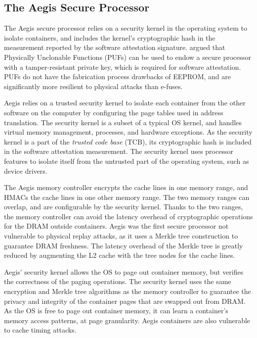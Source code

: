 \subsection{The Aegis Secure Processor}

The Aegis secure processor \cite{suh2003aegis} relies on a security kernel in the operating system to isolate containers, and includes the kernel's cryptographic hash in the measurement reported by the software attestation signature.  \cite{aegis_impl} argued that
Physically Unclonable Functions (PUFs) \cite{gassend2002puf} can be used to
endow a secure processor with a tamper-resistant private key, which is required
for software attestation. PUFs do not have the fabrication process drawbacks of
EEPROM, and are significantly more resilient to physical attacks than e-fuses.

Aegis relies on a trusted security kernel to isolate each container from the
other software on the computer by configuring the page tables used in address
translation. The security kernel is a subset of a typical OS kernel, and
handles virtual memory management, processes, and hardware exceptions. As the
security kernel is a part of the \textit{trusted code base} (TCB), its
cryptographic hash is included in the software attestation measurement. The
security kernel uses processor features to isolate itself from the untrusted
part of the operating system, such as device drivers.

The Aegis memory controller encrypts the cache lines in one memory range, and
HMACs the cache lines in one other memory range. The two memory ranges can
overlap, and are configurable by the security kernel. Thanks to the two ranges,
the memory controller can avoid the latency overhead of cryptographic
operations for the DRAM outside containers. Aegis was the first secure processor not vulnerable to physical
replay attacks, as it uses a Merkle tree construction \cite{gassend2003merkle}
to guarantee DRAM freshness. The latency overhead of the Merkle tree is greatly
reduced by augmenting the L2 cache with the tree nodes for the cache lines.

Aegis' security kernel allows the OS to page out container memory, but verifies
the correctness of the paging operations. The security kernel uses the same
encryption and Merkle tree algorithms as the memory controller to guarantee the
privacy and integrity of the container pages that are swapped out from DRAM.
As the OS is free to page out container memory, it can learn a container's
memory access patterns, at page granularity. Aegis containers are also
vulnerable to cache timing attacks.
